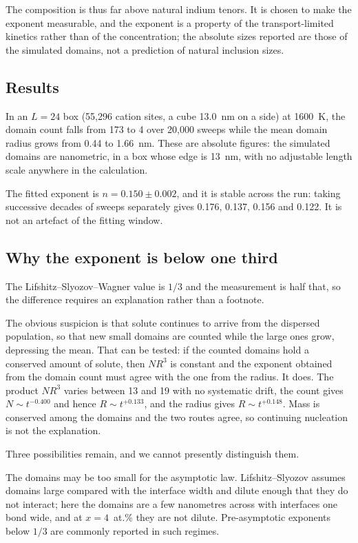 \documentclass[11pt,a4paper]{article}
\begin{document}
The composition is thus far above natural indium tenors. It is chosen to make
the exponent measurable, and the exponent is a property of the transport-limited
kinetics rather than of the concentration; the absolute sizes reported are those
of the simulated domains, not a prediction of natural inclusion sizes.

\subsection{Results}

In an $L = 24$ box (55{,}296 cation sites, a cube 13.0~nm on a side) at 1600~K,
the domain count falls from 173 to 4 over 20{,}000 sweeps while the mean domain
radius grows from 0.44 to 1.66~nm. These are absolute figures: the simulated
domains are nanometric, in a box whose edge is 13~nm, with no adjustable length
scale anywhere in the calculation.

The fitted exponent is $n = 0.150 \pm 0.002$, and it is stable across the run:
taking successive decades of sweeps separately gives 0.176, 0.137, 0.156 and
0.122. It is not an artefact of the fitting window.

\subsection{Why the exponent is below one third}

The Lifshitz--Slyozov--Wagner value is $1/3$ and the measurement is half that,
so the difference requires an explanation rather than a footnote.

The obvious suspicion is that solute continues to arrive from the dispersed
population, so that new small domains are counted while the large ones grow,
depressing the mean. That can be tested: if the counted domains hold a
conserved amount of solute, then $N R^3$ is constant and the exponent obtained
from the domain count must agree with the one from the radius. It does. The
product $N R^3$ varies between 13 and 19 with no systematic drift, the count
gives $N \sim t^{-0.400}$ and hence $R \sim t^{+0.133}$, and the radius gives
$R \sim t^{+0.148}$. Mass is conserved among the domains and the two routes
agree, so continuing nucleation is not the explanation.

Three possibilities remain, and we cannot presently distinguish them.

The domains may be too small for the asymptotic law. Lifshitz--Slyozov assumes
domains large compared with the interface width and dilute enough that they do
not interact; here the domains are a few nanometres across with interfaces one
bond wide, and at $x = 4$~at.\% they are not dilute. Pre-asymptotic exponents
below $1/3$ are commonly reported in such regimes.
\end{document}
